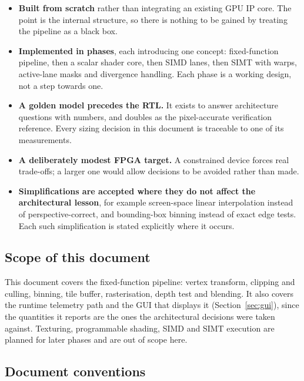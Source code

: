 \documentclass[11pt,a4paper]{article}
\begin{document}
\begin{itemize}[leftmargin=1.4em,itemsep=0.3em]
\item \textbf{Built from scratch} rather than integrating an existing GPU IP
      core. The point is the internal structure, so there is nothing to be
      gained by treating the pipeline as a black box.
\item \textbf{Implemented in phases}, each introducing one concept:
      fixed-function pipeline, then a scalar shader core, then SIMD lanes, then
      SIMT with warps, active-lane masks and divergence handling. Each phase is
      a working design, not a step towards one.
\item \textbf{A golden model precedes the RTL.} It exists to answer architecture
      questions with numbers, and doubles as the pixel-accurate verification
      reference. Every sizing decision in this document is traceable to one of
      its measurements.
\item \textbf{A deliberately modest FPGA target.} A constrained device forces
      real trade-offs; a larger one would allow decisions to be avoided rather
      than made.
\item \textbf{Simplifications are accepted where they do not affect the
      architectural lesson}, for example screen-space linear interpolation
      instead of perspective-correct, and bounding-box binning instead of exact
      edge tests. Each such simplification is stated explicitly where it occurs.
\end{itemize}

\subsection{Scope of this document}

This document covers the fixed-function pipeline: vertex transform, clipping and
culling, binning, tile buffer, rasterisation, depth test and blending.
It also covers the runtime telemetry path and the GUI that displays it
(Section~\ref{sec:gui}), since the quantities it reports are the ones the
architectural decisions were taken against.
Texturing, programmable shading, SIMD and SIMT execution are planned for later
phases and are out of scope here.

\subsection{Document conventions}
\end{document}
